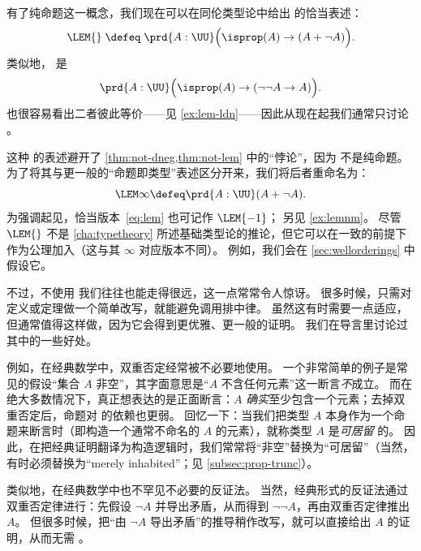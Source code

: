 %
%
有了纯命题这一概念，我们现在可以在同伦类型论中给出
%
%
%
的恰当表述：
\begin{equation}
  \label{eq:lem}
  \LEM{}\;\defeq\;
  \prd{A:\UU} \Big(\isprop(A) \to (A + \neg A)\Big).
\end{equation}
类似地，
%
%
%
是
\begin{equation}
  \label{eq:ldn}
  \prd{A:\UU} \Big(\isprop(A) \to (\neg\neg A \to A)\Big).
\end{equation}
也很容易看出二者彼此等价——见 \cref{ex:lem-ldn}——因此从现在起我们通常只讨论 \LEM{}。

这种 \LEM{} 的表述避开了 \cref{thm:not-dneg,thm:not-lem} 中的“悖论”，因为 \bool 不是纯命题。
为了将其与更一般的“命题即类型”表述区分开来，我们将后者重命名为：
\begin{equation*}
  \LEM\infty \defeq \prd{A:\UU} (A + \neg A).
\end{equation*}
为强调起见，恰当版本~\eqref{eq:lem}
也可记作 $\LEM{-1}$；
另见 \cref{ex:lemnm}。
尽管 $\LEM{}$
不是 \cref{cha:typetheory} 所述基础类型论的推论，但它可以在一致的前提下作为公理加入（这与其 $\infty$ 对应版本不同）。
例如，我们会在 \cref{sec:wellorderings} 中假设它。

不过，不使用 \LEM{} 我们往往也能走得很远，这一点常常令人惊讶。
很多时候，只需对定义或定理做一个简单改写，就能避免调用排中律。
虽然这有时需要一点适应，但通常值得这样做，因为它会得到更优雅、更一般的证明。
我们在导言里讨论过其中的一些好处。

例如，在经典数学中，双重否定经常被不必要地使用。
一个非常简单的例子是常见的假设“集合 $A$ 非空”，其字面意思是“$A$ 不含任何元素”这一断言\emph{不}成立。
而在绝大多数情况下，真正想表达的是正面断言：$A$ \emph{确实}至少包含一个元素；去掉双重否定后，命题对 \LEM{} 的依赖也更弱。
回忆一下：当我们把类型 $A$ 本身作为一个命题来断言时（即构造一个通常不命名的 $A$ 的元素），就称类型 $A$ 是\emph{可居留}
%
的。
因此，在把经典证明翻译为构造逻辑时，我们常常将“非空”替换为“可居留”（当然，有时必须替换为“merely inhabited”；见 \cref{subsec:prop-trunc}）。

类似地，在经典数学中也不罕见不必要的反证法。
%
当然，经典形式的反证法通过双重否定律进行：先假设 $\neg A$ 并导出矛盾，从而得到 $\neg \neg A$，再由双重否定律推出 $A$。
但很多时候，把“由 $\neg A$ 导出矛盾”的推导稍作改写，就可以直接给出 $A$ 的证明，从而无需 \LEM{}。

